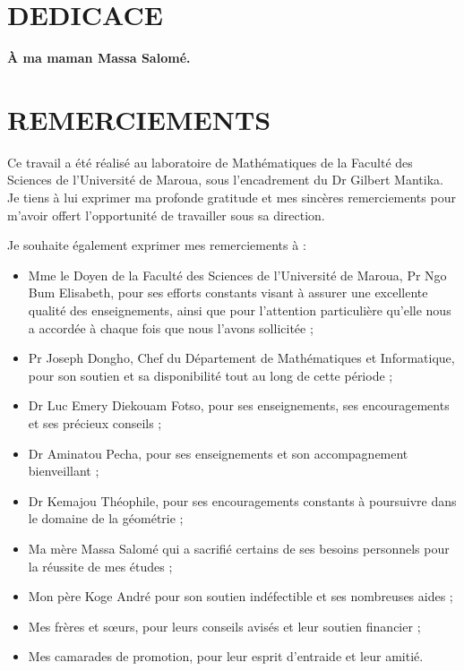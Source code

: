\documentclass[a4paper, 14pt]{report}
\newcommand{\applyfontsize}{%
	\fontsize{12}{12}\selectfont
}
\begin{document}
\newpage
\begin{onehalfspace} %
\lhead{}
\rhead{}
\chead{}


\chapter*{DEDICACE}

\begin{center}
\textbf{\textbf{ \LARGE À ma maman Massa Salomé.}}
\vspace{1cm} %
\end{center}

\chapter*{REMERCIEMENTS}
{
	\applyfontsize %
	
Ce travail a été réalisé au laboratoire de Mathématiques de la Faculté des Sciences de l’Université de Maroua, sous l’encadrement du Dr Gilbert Mantika. Je tiens à lui exprimer ma profonde gratitude et mes sincères remerciements pour m’avoir offert l’opportunité de travailler sous sa direction.

Je souhaite également exprimer mes remerciements à :
\begin{itemize}
	\item Mme le Doyen de la Faculté des Sciences de l’Université de Maroua, Pr Ngo Bum Elisabeth, pour ses efforts constants visant à assurer une excellente qualité des enseignements, ainsi que pour l'attention particulière qu'elle nous a accordée à chaque fois que nous l'avons sollicitée ;
	\item Pr Joseph Dongho, Chef du Département de Mathématiques et Informatique, pour son soutien et sa disponibilité tout au long de cette période ;
	\item Dr Luc Emery Diekouam Fotso, pour ses enseignements, ses encouragements et ses précieux conseils ;
	\item Dr Aminatou Pecha, pour ses enseignements et son accompagnement bienveillant ;
	\item Dr Kemajou Théophile, pour ses encouragements constants à poursuivre dans le domaine de la géométrie ;
	\item Ma mère Massa Salomé qui a sacrifié certains de ses besoins personnels pour la réussite de mes études ;
	\item Mon père Koge André pour son soutien indéfectible et ses nombreuses aides ;
	\item Mes frères et sœurs, pour leurs conseils avisés et leur soutien financier ;
	\item Mes camarades de promotion, pour leur esprit d’entraide et leur amitié.
\end{itemize}

}
\end{onehalfspace}
\end{document}
